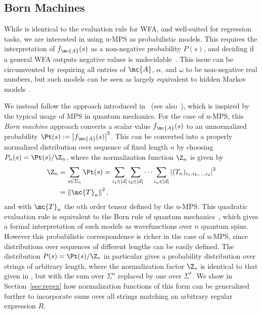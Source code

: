 \subsection{Born Machines}

While  is identical to the evaluation rule for WFA, and well-suited for regression tasks, we are interested in using u-MPS as probabilistic models. This requires the interpretation of $f_{\mc{A}}(s)$ as a non-negative probability $P(s)$, and deciding if a general WFA outputs negative values is  undecidable~\citep{denis2008}. This issue can be circumvented by requiring all entries of $\mc{A}$, $\alpha$, and $\omega$ to be non-negative real numbers, but such models can be seen as largely equivalent to hidden Markov models~\citep{denis2008}.

We instead follow the approach introduced in~\citep{pestun2017a} (see also~\citep{han2018}), which is inspired by the typical usage of MPS in quantum mechanics. For the case of u-MPS, this \emph{Born machine} approach converts a scalar value $f_{\mc{A}}(s)$ to an unnormalized probability $\Pt(s) := \left|f_{\mc{A}}(s)\right|^2$. This can be converted into a properly normalized distribution over sequence of fixed length $n$ by choosing $P_n(s) = \Pt(s) / \Z_n$, where the normalization function $\Z_n$ is given by
%
\begin{align}
\label{eq:partition_n}
\Z_n &= \sum_{s \in \Sigma_n} \Pt(s) = \sum_{i_1\in[d]} \sum_{i_2\in[d]} \cdots \sum_{i_n\in[d]} \left| (T_n)_{i_1,i_2,\ldots,i_d} \right|^2 \nonumber\\ 
&= \left\lVert\mc{T}_n\right\rVert^2,
\end{align}
%
and with $\mc{T}_n$ the $n$th order tensor defined by the u-MPS. This quadratic evaluation rule is equivalent to the Born rule of quantum mechanics~\citep{born1926}, which gives a formal interpretation of such models as wavefunctions over $n$ quantum spins. However this probabilistic correspondence is richer in the case of u-MPS, since distributions over sequences of different lengths can be easily defined. The distribution $P(s) = \Pt(s) / \Z_*$ in particular gives a probability distribution over strings of arbitrary length, where the normalization factor $\Z_*$ is identical to that given in , but with the sum over $\Sigma^n$ replaced by one over $\Sigma^*$. We show in Section~\ref{sec:regex} how normalization functions of this form can be generalized further to incorporate sums over all strings matching an arbitrary regular expression $R$.

